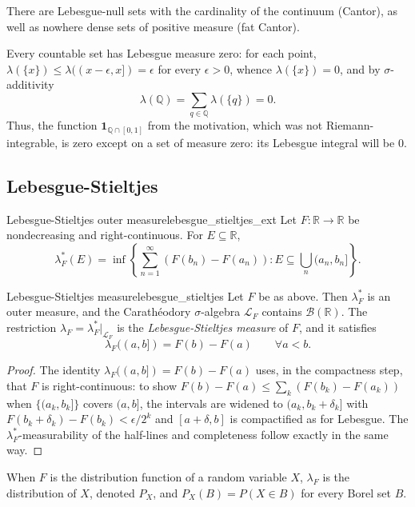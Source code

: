 \documentclass[11pt, a4paper]{article}
\begin{document}
\obs There are Lebesgue-null sets with the cardinality of the continuum (Cantor), as well as
nowhere dense sets of positive measure (fat Cantor).

\obs Every countable set has Lebesgue measure zero: for each point,
$\lambda(\{x\}) \le \lambda((x - \epsilon, x]) = \epsilon$ for every $\epsilon > 0$, whence
$\lambda(\{x\}) = 0$, and by $\sigma$-additivity
$$ \lambda(\mathbb{Q}) = \sum_{q \in \mathbb{Q}} \lambda(\{q\}) = 0. $$
Thus, the function $\mathbf{1}_{\mathbb{Q} \cap [0,1]}$ from the motivation, which was not
Riemann-integrable, is zero except on a set of measure zero: its Lebesgue integral
will be $0$.

\subsection{Lebesgue-Stieltjes}

\begin{definicion}{Lebesgue-Stieltjes outer measure}{lebesgue_stieltjes_ext}
Let $F: \mathbb{R} \to \mathbb{R}$ be nondecreasing and right-continuous. For $E \subseteq
\mathbb{R}$,
$$ \lambda_F^*(E) = \inf\!\left\{ \sum_{n=1}^\infty (F(b_n) - F(a_n)) : E \subseteq \bigcup_n
(a_n, b_n] \right\}. $$
\end{definicion}

\begin{teorema}{Lebesgue-Stieltjes measure}{lebesgue_stieltjes}
Let $F$ be as above. Then $\lambda_F^*$ is an outer measure, and the Carathéodory
$\sigma$-algebra $\mathcal{L}_F$ contains $\mathcal{B}(\mathbb{R})$. The restriction $\lambda_F =
\lambda_F^*|_{\mathcal{L}_F}$ is the \emph{Lebesgue-Stieltjes measure} of $F$, and it satisfies
$$ \lambda_F((a, b]) = F(b) - F(a) \qquad \forall a < b. $$
\end{teorema}

\begin{proof}
The identity $\lambda_F((a, b]) = F(b) - F(a)$ uses, in the compactness step, that
$F$ is right-continuous: to show
$F(b) - F(a) \le \sum_k (F(b_k) - F(a_k))$ when $\{(a_k, b_k]\}$ covers $(a, b]$, the
intervals are widened to $(a_k, b_k + \delta_k]$ with $F(b_k + \delta_k) - F(b_k) < \epsilon/2^k$
 and $[a + \delta, b]$ is compactified as for Lebesgue.
The $\lambda_F^*$-measurability of the half-lines and completeness follow exactly in the same way.
\end{proof}

\obs When $F$ is the
distribution function of a random variable $X$, $\lambda_F$ is the
distribution of $X$, denoted $P_X$, and $P_X(B) = P(X \in B)$ for every Borel set $B$.
\end{document}
